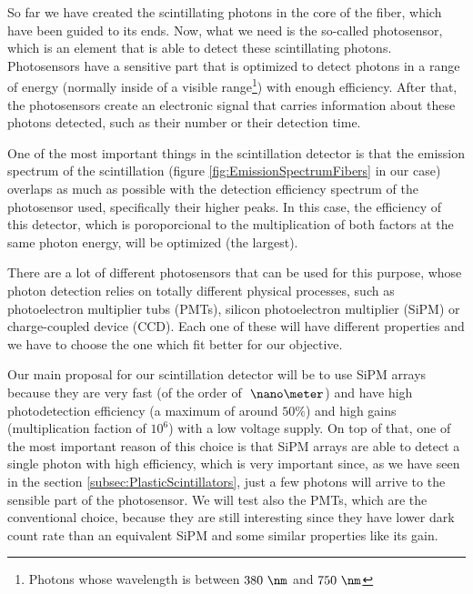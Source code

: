 So far we have created the scintillating photons in the core of the fiber, which have been guided to its ends. Now, what we need is the so-called photosensor, which is an element that is able to detect these scintillating photons. Photosensors have a sensitive part that is optimized to detect photons in a range of energy (normally inside of a visible range\footnote{Photons whose wavelength is between $380~\nm$ and $750~\nm$}) with enough efficiency. After that, the photosensors create an electronic signal that carries information about these photons detected, such as their number or their detection time.

One of the most important things in the scintillation detector is that the emission spectrum of the scintillation (figure \ref{fig:EmissionSpectrumFibers} in our case) overlaps as much as possible with the detection efficiency spectrum of the photosensor used, specifically their higher peaks. In this case, the efficiency of this detector,  which is poroporcional to the multiplication of both factors at the same photon energy, will be optimized (the largest).

There are a lot of different photosensors that can be used for this purpose, whose photon detection relies on totally different physical processes, such as photoelectron multiplier tubs (PMTs), silicon photoelectron multiplier (SiPM) or charge-coupled device (CCD).  Each one of these will have different properties and we have to choose the one which fit better for our objective.

Our main proposal for our scintillation detector will be to use SiPM arrays because they are very fast (of the order of $~\nano\meter$) and have high photodetection efficiency (a maximum of around $50\%$) and high gains (multiplication faction of $10^{6}$) with a low voltage supply. On top of that, one of the most important reason of this choice is that SiPM arrays are able to detect a single photon with high efficiency, which is very important since, as we have seen in the section \ref{subsec:PlasticScintillators}, just a few photons will arrive to the sensible part of the photosensor. We will test also the PMTs, which are the conventional choice, because they are still interesting since they have lower dark count rate than an equivalent SiPM and some similar properties like its gain.




